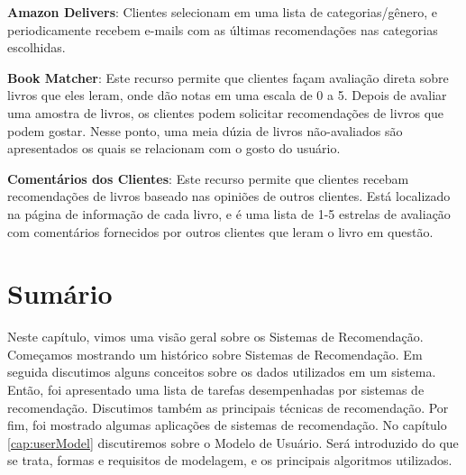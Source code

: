 \textbf{Amazon Delivers}: Clientes selecionam em uma lista de categorias/gênero, e periodicamente recebem e-mails com as últimas recomendações nas categorias escolhidas.

\textbf{Book Matcher}: Este recurso permite que clientes façam avaliação direta sobre livros que eles leram, onde dão notas em uma escala de 0 a 5. Depois de avaliar uma amostra de livros, os clientes podem solicitar recomendações de livros que podem gostar. Nesse ponto, uma meia dúzia de livros não-avaliados são apresentados os quais se relacionam com o gosto do usuário.

\textbf{Comentários dos Clientes}: Este recurso permite que clientes recebam recomendações de livros baseado nas opiniões de outros clientes. Está localizado na página de informação de cada livro, e é uma lista de 1-5 estrelas de avaliação com comentários fornecidos por outros clientes que leram o livro em questão.

\section{Sumário}

Neste capítulo, vimos uma visão geral sobre os Sistemas de Recomendação. Começamos mostrando um histórico sobre Sistemas de Recomendação. Em seguida discutimos alguns conceitos sobre os dados utilizados em um sistema. Então, foi apresentado uma lista de tarefas desempenhadas por sistemas de recomendação. Discutimos também as principais técnicas de recomendação. Por fim, foi mostrado algumas aplicações de sistemas de recomendação. No capítulo \ref{cap:userModel} discutiremos sobre o Modelo de Usuário. Será introduzido do que se trata, formas e requisitos de modelagem, e os principais algoritmos utilizados.